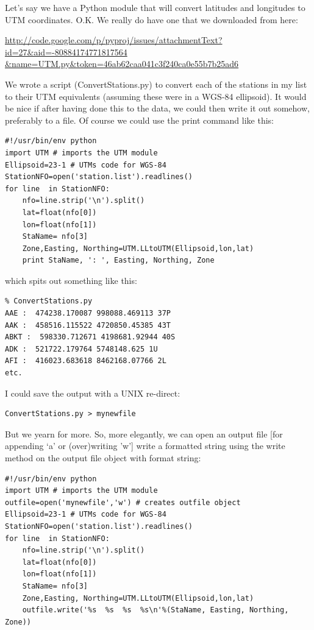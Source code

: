 \documentclass[11pt]{book}
\begin{document}
{{Let's say we  have a Python module that will convert latitudes and longitudes to UTM coordinates.  O.K. We really do have one that we downloaded from here:

\url{http://code.google.com/p/pyproj/issues/attachmentText?id=27\&aid=-80884174771817564 \&name=UTM.py\&token=46ab62caa041c3f240ca0e55b7b25ad6}

\noindent We wrote a script ({\color{blue}ConvertStations.py}) to convert each of the stations in my list to their UTM equivalents (assuming these were in a WGS-84 ellipsoid).  It would be nice if  after having done this to the data, we could then write it out somehow, preferably to a file.  Of course we could use the {\color{blue}print} command like this:


 { \color{blue} \begin{verbatim}
#!/usr/bin/env python
import UTM # imports the UTM module
Ellipsoid=23-1 # UTMs code for WGS-84
StationNFO=open('station.list').readlines()
for line  in StationNFO:
    nfo=line.strip('\n').split()
    lat=float(nfo[0])
    lon=float(nfo[1])
    StaName= nfo[3]
    Zone,Easting, Northing=UTM.LLtoUTM(Ellipsoid,lon,lat)
    print StaName, ': ', Easting, Northing, Zone
 \end{verbatim}}

\noindent
which spits out something like this:

{ \color{blue} \begin{verbatim}
% ConvertStations.py
AAE :  474238.170087 998088.469113 37P
AAK :  458516.115522 4720850.45385 43T
ABKT :  598330.712671 4198681.92944 40S
ADK :  521722.179764 5748148.625 1U
AFI :  416023.683618 8462168.07766 2L
etc.
\end{verbatim}}

\noindent
I could save the output with a UNIX re-direct:
 { \color{blue} \begin{verbatim}
ConvertStations.py > mynewfile
 \end{verbatim}}

But we yearn for more.  So,  more  elegantly, we can open an output file [for appending `a' or (over)writing 'w']  write a formatted string using the write method on  the output file object with format string:

 { \color{blue} \begin{verbatim}
#!/usr/bin/env python
import UTM # imports the UTM module
outfile=open('mynewfile','w') # creates outfile object
Ellipsoid=23-1 # UTMs code for WGS-84
StationNFO=open('station.list').readlines()
for line  in StationNFO:
    nfo=line.strip('\n').split()
    lat=float(nfo[0])
    lon=float(nfo[1])
    StaName= nfo[3]
    Zone,Easting, Northing=UTM.LLtoUTM(Ellipsoid,lon,lat)
    outfile.write('%s  %s  %s  %s\n'%(StaName, Easting, Northing, Zone))
\end{verbatim}}

}}
\end{document}
